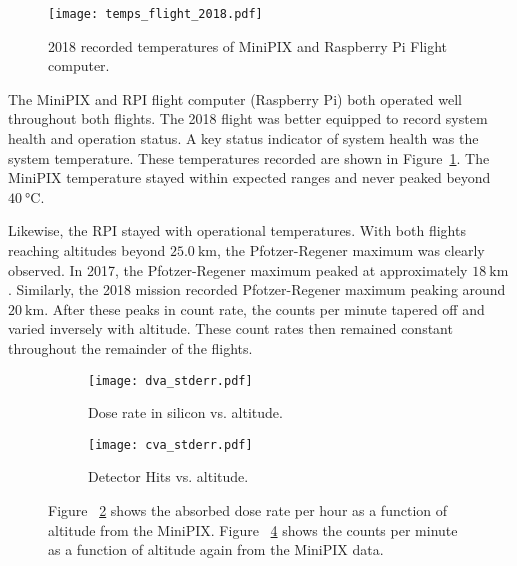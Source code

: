 %
\begin{figure}[H]
\centering
\texttt{[image: temps\_flight\_2018.pdf]}
\caption{2018 recorded temperatures of MiniPIX and Raspberry Pi Flight computer.}
\label{fig:temps_2018}
\end{figure}
%
The MiniPIX and RPI flight computer (Raspberry Pi) both operated well throughout both flights.  The 2018 flight was better equipped to record system health and operation status.  A key status indicator of system health was the system temperature.  These temperatures recorded are shown in Figure~\ref{fig:temps_2018}.  The MiniPIX temperature stayed within expected ranges and never peaked beyond $\SI{40}{\degreeCelsius}$.  

Likewise, the RPI stayed with operational temperatures.
With both flights reaching altitudes beyond $\SI{25.0}{\kilo\meter}$, the Pfotzer-Regener maximum was clearly observed.  In 2017, the Pfotzer-Regener maximum peaked at approximately  $\SI{18}{\kilo\meter}$.  Similarly, the 2018 mission recorded Pfotzer-Regener maximum peaking around $\SI{20}{\kilo\meter}$. After these peaks in count rate, the counts per minute tapered off and varied inversely with altitude.  These count rates then remained constant throughout the remainder of the flights.
%
%
%
\begin{figure}[H]
\centering
\begin{subfigure}{.5\textwidth}
  \centering
  \texttt{[image: dva\_stderr.pdf]}
  \caption{Dose rate in silicon vs. altitude.}
  \label{fig:sub1}
\end{subfigure}%
\begin{subfigure}{.5\textwidth}
  \centering
  \texttt{[image: cva\_stderr.pdf]}
  \caption{Detector Hits vs. altitude.}
  \label{fig:sub2}
\end{subfigure}
\caption{Figure ~\ref{fig:sub1} shows the absorbed dose rate per hour as a function of altitude from the MiniPIX.  Figure ~\ref{fig:sub2} shows the counts per minute as a function of altitude again from the MiniPIX data.}
\label{fig:sub2}
\end{figure}
